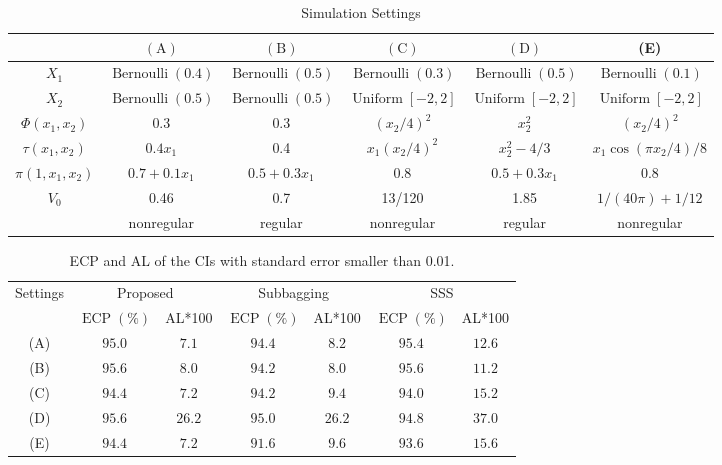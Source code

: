\documentclass[11pt]{article}
\theoremstyle{referenceplain}
\theoremstyle{referencedefinition}
\theoremstyle{referenceremark}
\begin{document}
\begin{table}[H]
    \centering
    \scriptsize
     \caption{Simulation Settings}
\begin{tabular}{cccccc}
\hline \hline & $(\mathrm{A})$ & $(\mathrm{B})$ & $(\mathrm{C})$ & $(\mathrm{D})$ & (E)  \\
\hline $X_1$ & $\operatorname{Bernoulli}(0.4)$ & $\operatorname{Bernoulli}(0.5)$ & $\operatorname{Bernoulli}(0.3)$ & $\operatorname{Bernoulli}(0.5)$ & $\operatorname{Bernoulli}(0.1)$\\
\hline $X_2$ & $\operatorname{Bernoulli}(0.5)$ & $\operatorname{Bernoulli}(0.5)$ & $\operatorname{Uniform}[-2,2]$ & $\operatorname{Uniform}[-2,2]$ & $\operatorname{Uniform}[-2,2]$ \\
\hline$\Phi\left(x_1, x_2\right)$ & 0.3 & 0.3 & $(x_2/4)^2$ & $x_2^2$ & $(x_2/4)^2$  \\
\hline$\tau\left(x_1, x_2\right)$ & $0.4 x_1$ & 0.4 & $x_1 (x_2/4)^2$ & $x_2^2-4 / 3$ & $ x_1 \cos \left(\pi x_2 / 4\right)/8$ \\
\hline $\pi(1,x_1,x_2)$ & $0.7+0.1x_1$ & $0.5+0.3x_1$ & 0.8 & $0.5+0.3x_1$ & 0.8 \\
\hline$V_0$ & 0.46 & 0.7 & 13/120 & 1.85 & $1/(40\pi) + 1/12$ \\
\hline & nonregular & regular & nonregular & regular & nonregular
\\\hline
\end{tabular}
\label{sin-setting}
\end{table}
\begin{table}[H]
\centering
\scriptsize
    \caption{ECP and AL of the CIs with standard error smaller than 0.01.}
\begin{tabular}{|c|c|c|c|c|c|c|}
\hline \multirow{2}{*}{Settings}  & \multicolumn{2}{c|}{ Proposed} & \multicolumn{2}{c|}{ Subbagging } & \multicolumn{2}{c|}{ SSS }\\
\cline{2-7}   & $\operatorname{ECP}(\%)$ & AL*100 & $\operatorname{ECP}(\%)$ & AL*100 & $\operatorname{ECP}(\%)$ & AL*100 \\
\hline (A)  & $95.0$ & $7.1$ & $94.4$ & $8.2$ & $95.4$ & $12.6$ \\
\hline (B)  & $95.6$ & $8.0$ & $94.2$ & $8.0$ & $95.6$ & $11.2$ \\
\hline (C)  & $94.4$ & $7.2$ & $94.2$ & $9.4$ & $94.0$ & $15.2$ \\
\hline (D)  & $95.6$ & $26.2$ & $95.0$ & $26.2$ & $94.8$ & $37.0$ \\
\hline (E) & $94.4$ & $7.2$ & $91.6$ & $9.6$ & $93.6$ & $15.6$\\
\hline
\end{tabular}
    \label{Single-sim}
\end{table}
\end{document}
